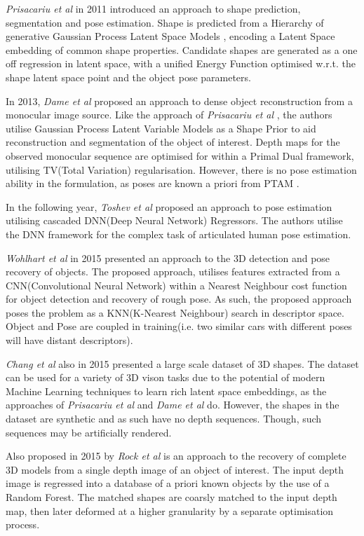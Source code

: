 \textit{Prisacariu et al} \cite{Prisacariu2011} in 2011 introduced an approach to shape prediction, 
segmentation and pose estimation. Shape is predicted from a Hierarchy of generative Gaussian Process 
Latent Space Models \cite{Lawrence2005}, encoding a Latent Space embedding of common shape properties. 
Candidate shapes are generated as a one off regression in latent space, with a unified Energy Function 
optimised w.r.t. the shape latent space point and the object pose parameters.

In 2013, \textit{Dame et al} \cite{Dame2013} proposed an approach to dense object reconstruction from a 
monocular image source. Like the approach of \textit{Prisacariu et al} \cite{Prisacariu2011}, the authors 
utilise Gaussian Process Latent Variable Models as a Shape Prior to aid reconstruction and segmentation 
of the object of interest. Depth maps for the observed monocular sequence are optimised for within a 
Primal Dual framework, utilising TV(Total Variation) regularisation. However, there is no pose estimation 
ability in the formulation, as poses are known a priori from PTAM \cite{PTAM}.

In the following year, \textit{Toshev et al} \cite{Toshev2014} proposed an approach to pose estimation 
utilising cascaded DNN(Deep Neural Network) Regressors. The authors utilise the DNN framework for the 
complex task of articulated human pose estimation.

\textit{Wohlhart et al} \cite{Wohlhart2015} in 2015 presented an approach to the 3D detection and pose 
recovery of objects. The proposed approach, utilises features extracted from a CNN(Convolutional Neural 
Network) within a Nearest Neighbour cost function for object detection and recovery of rough pose. As such, 
the proposed approach poses the problem as a KNN(K-Nearest Neighbour) search in descriptor space. Object 
and Pose are coupled in training(i.e. two similar cars with different poses will have distant descriptors).

\textit{Chang et al} \cite{Chang2015} also in 2015 presented a large scale dataset of 3D shapes. The 
dataset can be used for a variety of 3D vison tasks due to the potential of modern Machine Learning 
techniques to learn rich latent space embeddings, as the approaches of \textit{Prisacariu et al} 
\cite{Prisacariu2011} and \textit{Dame et al} \cite{Dame2013} do. However, the shapes in the dataset 
are synthetic and as such have no depth sequences. Though, such sequences may be artificially rendered.

Also proposed in 2015 by \textit{Rock et al} \cite{Rock2015} is an approach to the recovery of complete 
3D models from a single depth image of an object of interest. The input depth image is regressed into a 
database of a priori known objects by the use of a Random Forest. The matched shapes are coarsly matched 
to the input depth map, then later deformed at a higher granularity by a separate optimisation process.

